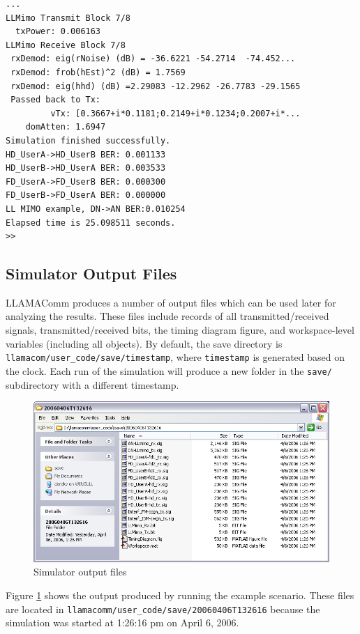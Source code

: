 \begin{lstlisting}[name=output,numbers=none]
 ...
LLMimo Transmit Block 7/8
  txPower: 0.006163
LLMimo Receive Block 7/8
 rxDemod: eig(rNoise) (dB) = -36.6221 -54.2714  -74.452...
 rxDemod: frob(hEst)^2 (dB) = 1.7569
 rxDemod: eig(hhd) (dB) =2.29083 -12.2962 -26.7783 -29.1565
 Passed back to Tx:
         vTx: [0.3667+i*0.1181;0.2149+i*0.1234;0.2007+i*...
    domAtten: 1.6947
Simulation finished successfully.
HD_UserA->HD_UserB BER: 0.001133
HD_UserB->HD_UserA BER: 0.003533
FD_UserA->FD_UserB BER: 0.000300
FD_UserB->FD_UserA BER: 0.000000
LL MIMO example, DN->AN BER:0.010254
Elapsed time is 25.098511 seconds.
>>
\end{lstlisting}

\subsection{Simulator Output Files} \label{sec:simOutputFiles}

LLAMAComm produces a number of output files which can be used later
for analyzing the results.  These files include records of all
transmitted/received signals, transmitted/received bits, the timing
diagram figure, and workspace-level variables (including all
objects).  By default, the save directory is
\verb+llamacom/user_code/save/timestamp+, where \verb+timestamp+ is generated
based on the clock.  Each run of the simulation will produce a new
folder in the \verb+save/+ subdirectory with a different timestamp.

\begin{figure}[h]
\centering
\includegraphics[width=5in]{figs/Save_Files}
\caption{Simulator output files}
\label{fig:saveFiles}
\end{figure}

Figure \ref{fig:saveFiles} shows the output produced by running the
example scenario.  These files are located in
\verb+llamacomm/user_code/save/20060406T132616+ because the simulation was
started at 1:26:16 pm on April 6, 2006.

